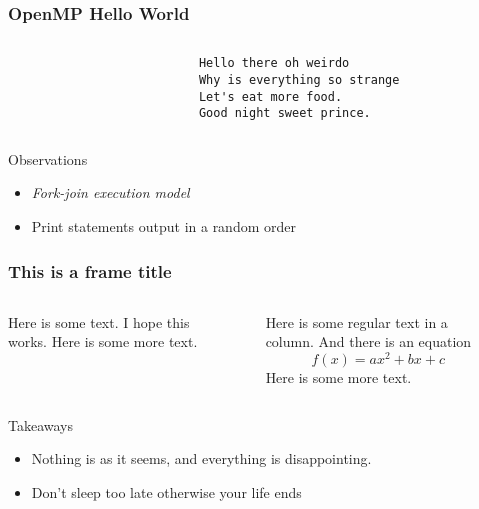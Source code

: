 \documentclass[handout]{beamer}
\begin{document}
\begin{frame}[fragile]
  \frametitle{OpenMP Hello World}
  \begin{columns}[t]%
    \begin{column}{0.65\textwidth}
      \inputminted{c}{src/ex1.c}
    \end{column}
    \pause
    \begin{column}{0.4\textwidth}
      \begin{verbatim}
        Hello there oh weirdo
        Why is everything so strange
        Let's eat more food.
        Good night sweet prince.
      \end{verbatim}
    \end{column}
  \end{columns}
  \pause
  \begin{block}{Observations}
    \begin{itemize}
    \item \emph{Fork-join execution model}
    \item Print statements output in a random order
    \end{itemize}
  \end{block}
\end{frame}
\begin{frame}
  \frametitle{This is a frame title}
  \begin{columns}[onlytextwidth]
    \begin{column}{0.4\textwidth}
      \centering
      Here is some text. I hope this works. Here is some more text.
    \end{column}
    \begin{column}{0.2\textwidth}
      \centering
      \rule{40pt}{150pt}%
    \end{column}
    \begin{column}{0.4\textwidth}
    Here is some regular text in a column. And there is an equation
    \[
      f(x)=ax^2+bx+c
    \]
    Here is some more text.
    \end{column}
​  \end{columns}
  \begin{block}{Takeaways}
    \begin{itemize}
    \item Nothing is as it seems, and everything is disappointing.
    \item Don't sleep too late otherwise your life ends
    \end{itemize}
  \end{block}

\end{frame}
\end{document}

